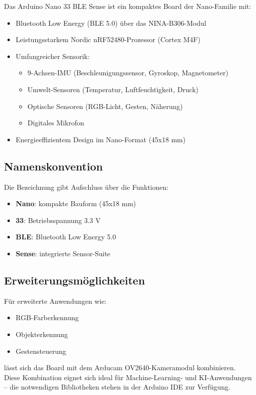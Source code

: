 Das Arduino Nano 33 BLE Sense ist ein kompaktes Board der Nano-Familie mit:
\begin{itemize}
	\item Bluetooth Low Energy (BLE 5.0) über das NINA-B306-Modul
	\item Leistungsstarkem Nordic nRF52480-Prozessor (Cortex M4F)
	\item Umfangreicher Sensorik:
	\begin{itemize}
		\item 9-Achsen-IMU (Beschleunigungssensor, Gyroskop, Magnetometer)
		\item Umwelt-Sensoren (Temperatur, Luftfeuchtigkeit, Druck)
		\item Optische Sensoren (RGB-Licht, Gesten, Näherung)
		\item Digitales Mikrofon
	\end{itemize}
	\item Energieeffizientem Design im Nano-Format (45x18 mm)
\end{itemize}

\subsection*{Namenskonvention}
Die Bezeichnung gibt Aufschluss über die Funktionen:
\begin{itemize}
	\item \textbf{Nano}: kompakte Bauform (45x18 mm)
	\item \textbf{33}: Betriebsspannung 3.3 V
	\item \textbf{BLE}: Bluetooth Low Energy 5.0
	\item \textbf{Sense}: integrierte Sensor-Suite
\end{itemize}

\subsection*{Erweiterungsmöglichkeiten}
Für erweiterte Anwendungen wie:
\begin{itemize}
	\item RGB-Farberkennung
	\item Objekterkennung
	\item Gestensteuerung
\end{itemize}
lässt sich das Board mit dem Arducam OV2640-Kameramodul kombinieren. Diese Kombination eignet sich ideal für Machine-Learning- und KI-Anwendungen – die notwendigen Bibliotheken stehen in der Arduino IDE zur Verfügung.


